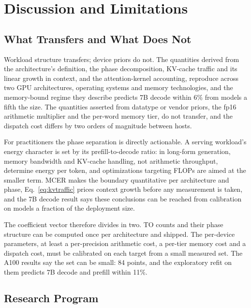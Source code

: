 \documentclass[conference]{IEEEtran}
\begin{document}
\section{Discussion and Limitations}
\label{sec:discussion}

\subsection{What Transfers and What Does Not}

Workload structure transfers; device priors do not. The quantities derived
from the architecture's definition, the phase decomposition, KV-cache
traffic and its linear growth in context, and the attention-kernel
accounting, reproduce across two GPU architectures, operating systems and
memory technologies, and the memory-bound regime they describe predicts 7B
decode within 6\% from models a fifth the size. The quantities asserted from
datatype or vendor priors, the fp16 arithmetic multiplier and the per-word
memory tier, do not transfer, and the dispatch cost differs by two orders of
magnitude between hosts.

For practitioners the phase separation is directly actionable. A serving
workload's energy character is set by its prefill-to-decode ratio: in
long-form generation, memory bandwidth and KV-cache handling, not arithmetic
throughput, determine energy per token, and optimizations targeting FLOPs
are aimed at the smaller term. MCER makes the boundary quantitative per
architecture and phase, Eq.~\ref{eq:kvtraffic} prices context growth before
any measurement is taken, and the 7B decode result says these conclusions
can be reached from calibration on models a fraction of the deployment
size.

The coefficient vector therefore divides in two. TO counts and their phase
structure can be computed once per architecture and shipped. The per-device
parameters, at least a per-precision arithmetic cost, a per-tier memory
cost and a dispatch cost, must be calibrated on each target from a small
measured set. The A100 results say the set can be small: 84 points, and the
exploratory refit on them predicts 7B decode and prefill within 11\%.

\subsection{Research Program}
\end{document}
